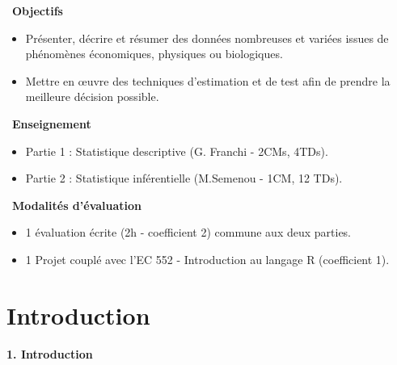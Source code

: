 \documentclass[aspectratio=169,xcolor=dvipsnames]{beamer}
\begin{document}
\begin{frame}[plain]
\textcolor{nyubluedarker}{{\Large \faBullseye \ \textbf{Objectifs}}}
	\begin{itemize}
	\item Présenter, décrire et résumer des données nombreuses et variées issues de phénomènes économiques, physiques ou biologiques.
	\item Mettre en \oe{}uvre des techniques d'estimation et de test afin de prendre la meilleure décision possible.
	\end{itemize}
	
	\medskip
	
	\textcolor{nyubluedarker}{{\Large \faChalkboardTeacher \ \textbf{Enseignement}}}
	\begin{itemize}
	\item Partie 1 : Statistique descriptive (G. Franchi - 2CMs, 4TDs).
	\item Partie 2 : Statistique inférentielle (M.Semenou - 1CM, 12 TDs).
	\end{itemize}	
	
	\medskip

\textcolor{nyubluedarker}{{\Large \faGraduationCap \ \textbf{Modalités d'évaluation}}}
	\begin{itemize}
	\item 1 évaluation écrite (2h - coefficient 2) commune aux deux parties.
	\item 1 Projet couplé avec l'EC 552 - Introduction au langage R (coefficient 1).
	\end{itemize}

\end{frame}


\section{Introduction}

\begin{frame}[plain]

\vfill

\begin{center}
{\huge \textcolor{nyubluedark}{\textbf{1. Introduction}}}
\end{center}

\vfill

\end{frame}
\end{document}
